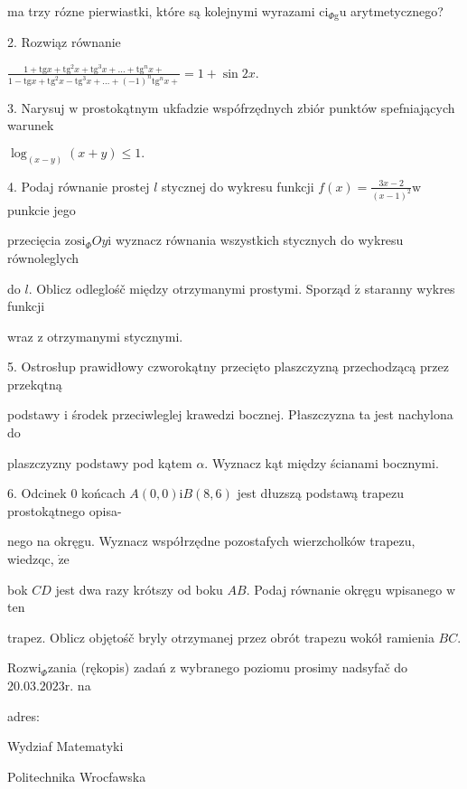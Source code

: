 \documentclass[a4paper,12pt]{article}
\begin{document}
ma trzy rózne pierwiastki, które są kolejnymi wyrazami $\mathrm{c}\mathrm{i}_{\Phi \mathrm{g}}\mathrm{u}$ arytmetycznego?

2. Rozwiąz równanie

$\displaystyle \frac{1+\mathrm{t}\mathrm{g}x+\mathrm{t}\mathrm{g}^{2}x+\mathrm{t}\mathrm{g}^{3}x+\ldots+\mathrm{t}\mathrm{g}^{n}x+}{1-\mathrm{t}\mathrm{g}x+\mathrm{t}\mathrm{g}^{2}x-\mathrm{t}\mathrm{g}^{3}x+\ldots+(-1)^{n}\mathrm{t}\mathrm{g}^{n}x+}=1+\sin 2x.$

3. Narysuj $\mathrm{w}$ prostokątnym ukfadzie wspófrzędnych zbiór punktów spefniających warunek

$\log_{(x-y)}(x+y)\leq 1.$

4. Podaj równanie prostej $l$ stycznej do wykresu funkcji $f(x)=\displaystyle \frac{3x-2}{(x-1)^{2}} \mathrm{w}$ punkcie jego

przecięcia $\mathrm{z}\mathrm{o}\mathrm{s}\mathrm{i}_{\Phi}Oy\mathrm{i}$ wyznacz równania wszystkich stycznych do wykresu równoleglych

do $l$. Oblicz odleglośč między otrzymanymi prostymi. Sporząd $\acute{\mathrm{z}}$ staranny wykres funkcji

wraz $\mathrm{z}$ otrzymanymi stycznymi.

5. Ostrosłup prawidłowy czworokątny przecięto plaszczyzną przechodzącą przez przekqtną

podstawy $\mathrm{i}$ środek przeciwleglej krawedzi bocznej. Płaszczyzna ta jest nachylona do

plaszczyzny podstawy pod kątem $\alpha$. Wyznacz kąt między ścianami bocznymi.

6. Odcinek $0$ końcach $A(0,0)\mathrm{i}B(8,6)$ jest dłuzszą podstawą trapezu prostokątnego opisa-

nego na okręgu. Wyznacz współrzędne pozostafych wierzcholków trapezu, wiedzqc, $\dot{\mathrm{z}}\mathrm{e}$

bok $CD$ jest dwa razy krótszy od boku $AB$. Podaj równanie okręgu wpisanego $\mathrm{w}$ ten

trapez. Oblicz objętośč bryly otrzymanej przez obrót trapezu wokół ramienia $BC.$

$\mathrm{R}\mathrm{o}\mathrm{z}\mathrm{w}\mathrm{i}_{\Phi}$zania (rękopis) zadań $\mathrm{z}$ wybranego poziomu prosimy nadsyfač do $20.03.2023\mathrm{r}$. na

adres:

Wydziaf Matematyki

Politechnika Wrocfawska
\end{document}

